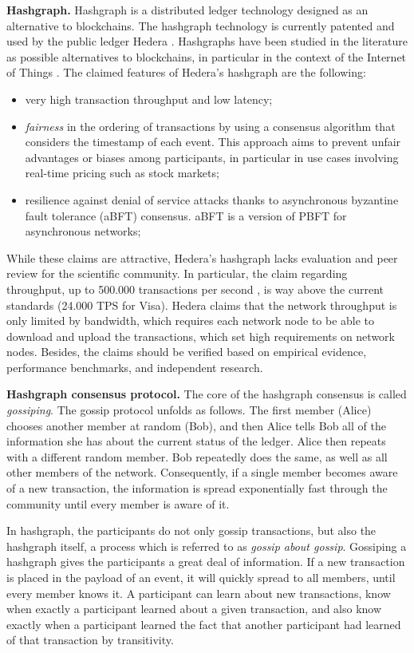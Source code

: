  \textbf{Hashgraph.} Hashgraph is a distributed ledger technology designed as an alternative to blockchains.
  The hashgraph technology is currently patented and used by the public ledger Hedera \cite{Baird2018}. Hashgraphs
  have been studied in the literature as possible alternatives to blockchains, in particular in the context 
  of the Internet of Things \cite{Bansal2020, Gao2022, Jha2022, Tarlan2022}. The claimed features of Hedera's hashgraph are the following:
  \begin{itemize}
    \item very high transaction throughput and low latency;
    \item \emph{fairness} in the ordering of transactions by using a consensus algorithm that considers the timestamp of each event.
     This approach aims to prevent unfair advantages or biases among participants, in particular in use cases involving real-time pricing such as stock markets;
     \item resilience against denial of service attacks thanks to asynchronous byzantine fault tolerance (aBFT) consensus. aBFT is 
     a version of PBFT for asynchronous networks; 
  \end{itemize} 

While these claims are attractive, Hedera's hashgraph lacks evaluation and peer review for the scientific community. 
In particular, the claim regarding throughput, up to 500.000 transactions per second \cite{Baird2018}, is way above the current
standards (24.000 TPS for Visa). Hedera claims that the network throughput is only limited by bandwidth, which requires each network 
node to be able to download and upload the transactions, which set high requirements on network nodes. Besides, the 
claims should be verified based on empirical evidence, performance benchmarks, and independent research.

\textbf{Hashgraph consensus protocol.} The core of the hashgraph consensus is called \emph{gossiping}. The gossip protocol unfolds as follows. 
The first member (Alice) chooses another member at random (Bob), and then Alice tells Bob all of the information she has about the current status 
of the ledger. Alice then repeats with a different
random member. Bob repeatedly does the same, as well as all other members of the 
network. Consequently, if a single member becomes aware of a new transaction, 
the information is spread exponentially fast through the community until every member is aware of
it.

In hashgraph, the participants do not only gossip transactions, but also the hashgraph itself, 
a process which is referred to as \emph{gossip about gossip}.
Gossiping a hashgraph gives the participants a great deal of information. 
If a new transaction is placed in the payload of an event, it will quickly spread to all
members, until every member knows it. A participant can learn about new transactions, know 
when exactly a participant learned about a given transaction, and also know
exactly when a participant learned the fact that another participant had learned of that transaction by transitivity.

